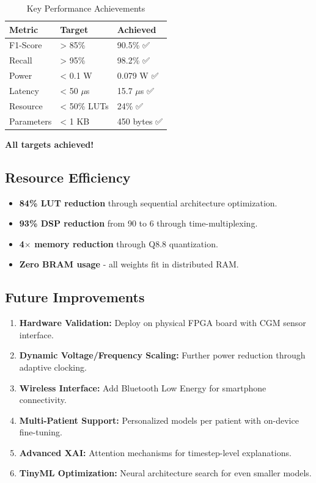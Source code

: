 \documentclass[11pt, a4paper]{article}
\begin{document}
\begin{table}[H]
\centering
\caption{Key Performance Achievements}
\label{tab:achievements}
\begin{tabular}{@{}lll@{}}
\toprule
\textbf{Metric} & \textbf{Target} & \textbf{Achieved} \\ \midrule
F1-Score & > 85\% & 90.5\% ✅ \\
Recall & > 95\% & 98.2\% ✅ \\
Power & < 0.1 W & 0.079 W ✅ \\
Latency & < 50 $\mu$s & 15.7 $\mu$s ✅ \\
Resource & < 50\% LUTs & 24\% ✅ \\
Parameters & < 1 KB & 450 bytes ✅ \\ \bottomrule
\end{tabular}
\end{table}

\textbf{All targets achieved!}

\subsection{Resource Efficiency}

\begin{itemize}
    \item \textbf{84\% LUT reduction} through sequential architecture optimization.
    \item \textbf{93\% DSP reduction} from 90 to 6 through time-multiplexing.
    \item \textbf{4$\times$ memory reduction} through Q8.8 quantization.
    \item \textbf{Zero BRAM usage} - all weights fit in distributed RAM.
\end{itemize}

\subsection{Future Improvements}

\begin{enumerate}
    \item \textbf{Hardware Validation:} Deploy on physical FPGA board with CGM sensor interface.
    
    \item \textbf{Dynamic Voltage/Frequency Scaling:} Further power reduction through adaptive clocking.
    
    \item \textbf{Wireless Interface:} Add Bluetooth Low Energy for smartphone connectivity.
    
    \item \textbf{Multi-Patient Support:} Personalized models per patient with on-device fine-tuning.
    
    \item \textbf{Advanced XAI:} Attention mechanisms for timestep-level explanations.
    
    \item \textbf{TinyML Optimization:} Neural architecture search for even smaller models.
\end{enumerate}
\end{document}
